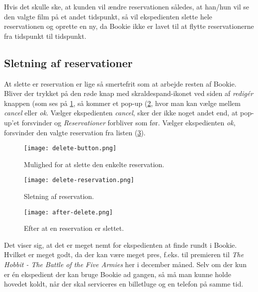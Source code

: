 Hvis det skulle ske, at kunden vil ændre reservationen således, at han/hun vil se den valgte film på et andet tidspunkt, så vil ekspedienten slette hele reservationen og oprette en ny, da Bookie ikke er lavet til at flytte reservationerne fra tidspunkt til tidspunkt.

\subsection{Sletning af reservationer}

At slette er reservation er lige så smertefrit som at arbejde resten af Bookie. Bliver der trykket på den røde knap med skraldespand-ikonet ved siden af \textit{redigér} knappen (som ses på \ref{screenshot: delete-button}, så kommer et pop-up (\ref{screenshot: delete-reservation}, hvor man kan vælge mellem \textit{cancel} eller \textit{ok}. Vælger ekspedienten \textit{cancel}, sker der ikke noget andet end, at pop-up'et forsvinder og \textit{Reservationer} forbliver som før. Vælger ekspedienten \textit{ok}, forsvinder den valgte reservation fra listen (\ref{screenshot: after-delete}).

\begin{figure} [h]
  \centering
  \texttt{[image: delete-button.png]}
  \caption{Mulighed for at slette den enkelte reservation.}
  \label{screenshot: delete-button}
\end{figure}

\begin{figure} [h]
  \centering
  \texttt{[image: delete-reservation.png]}
  \caption{Sletning af reservation.}
  \label{screenshot: delete-reservation}
\end{figure}

\begin{figure} [h]
  \centering
  \texttt{[image: after-delete.png]}
  \caption{Efter at en reservation er slettet.}
  \label{screenshot: after-delete}
\end{figure}

Det viser sig, at det er meget nemt for ekspedienten at finde rundt i Bookie. Hvilket er meget godt, da der kan være meget pres, f.eks. til premieren til \textit{The Hobbit - The Battle of the Five Armies} her i december måned. Selv om der kun er én ekspedient der kan bruge Bookie ad gangen, så må man kunne holde hovedet koldt, når der skal serviceres en billetluge og en telefon på samme tid.